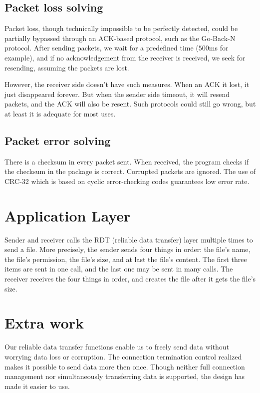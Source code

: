 \documentclass[10pt,a4paper]{article}
\begin{document}
    \subsection{Packet loss solving}
        Packet loss, though technically impossible to be perfectly detected, could be partially bypassed through an ACK-based protocol, such as the Go-Back-N protocol. After sending packets, we wait for a predefined time ($500$ms for example), and if no acknowledgement from the receiver is received, we seek for resending, assuming the packets are lost.

       	However, the receiver side doesn't have such measures. When an ACK it lost, it just disappeared forever. But when the sender side timeout, it will resend packets, and the ACK will also be resent. Such protocols could still go wrong, but at least it is adequate for most uses.
    \subsection{Packet error solving}
        There is a checksum in every packet sent. When received, the program checks if the checksum in the package is correct. Corrupted packets are ignored. The use of CRC-32 which is based on cyclic error-checking codes guarantees low error rate.

\section{Application Layer}
    
    Sender and receiver calls the RDT (reliable data transfer) layer multiple times to send a file. More precisely, the sender sends four things in order: the file's name, the file's permission, the file's size, and at last the file's content. The first three items are sent in one call, and the last one may be sent in many calls. The receiver receives the four things in order, and creates the file after it gets the file's size.

\section{Extra work}

    Our reliable data transfer functions enable us to freely send data without worrying data loss or corruption. The connection termination control realized makes it possible to send data more then once. Though neither full connection management nor simultaneously transferring data is supported, the design has made it easier to use.
\end{document}

